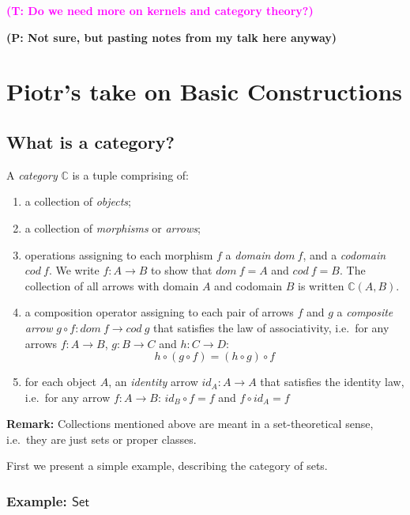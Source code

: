 \documentclass{amsart}
\theoremstyle{definition}
\newcommand{\truls}[1]{\textbf{\textcolor{magenta}{(T: #1)}}}
\newcommand{\piotr}[1]{\textbf{\textcolor{OliveGreen}{(P: #1)}}}
\newcommand{\cat}[1]{\mathsf{#1}} %
\newcommand{\acat}[1]{\mathbb{#1}} %
\renewcommand{\emph}{\textit} %
\begin{document}
\truls{Do we need more on kernels and category theory?}

\piotr{Not sure, but pasting notes from my talk here anyway}

\section{Piotr's take on Basic Constructions}

\subsection{What is a category?}

A \emph{category} $\acat{C}$ is a tuple comprising of:

\begin{enumerate}
\item a collection of \emph{objects};
\item a collection of \emph{morphisms} or \emph{arrows};
\item  operations assigning to each morphism $f$ a \emph{domain} $dom\ f$,
  and a \emph{codomain} $cod\ f$. We write $f: A \to B$ to show that
  $dom\ f = A$ and $cod\ f = B$. The collection of all arrows with
  domain $A$ and codomain $B$ is written $\acat{C}(A,B)$.
\item a composition operator assigning to each pair of arrows $f$ and $g$ a
  \emph{composite arrow} $g\circ f: dom\ f\to cod\ g$ that satisfies the
  law of associativity, i.e.~for any arrows $f: A \to B$, $g: B\to C$
  and $h: C \to D$: \[
  h\circ (g \circ f) = (h \circ g) \circ f
  \]
\item for each object $A$, an \emph{identity} arrow $id_A: A \to A$ that
  satisfies the identity law, i.e.~for any arrow $f: A\to B$:
  $id_B \circ f = f$ and $f\circ id_A = f$
\end{enumerate}

\textbf{Remark:} Collections mentioned above are meant in a
set-theoretical sense, i.e.~they are just sets or proper classes.

First we present a simple example, describing the category of sets.

\subsubsection{Example: $\cat{Set}$}
\end{document}
